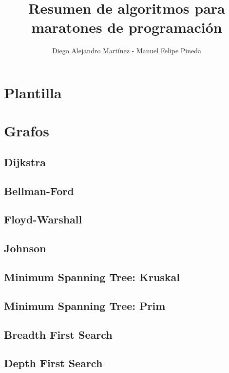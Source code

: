\documentclass[10pt,letterpaper,twocolumn,twosided]{article}
\newcommand{\codigofuente}[1]{

\dotfill
}
\begin{document}
\title{Resumen de algoritmos para maratones de programación}
\author{Diego Alejandro Martínez - Manuel Felipe Pineda}
\maketitle

\tableofcontents
{}


\section{Plantilla}
\codigofuente{../src/template.ext}

\section{Grafos}

\subsection{Dijkstra}

\subsection{Bellman-Ford}

\subsection{Floyd-Warshall}

\subsection{Johnson}

\subsection{Minimum Spanning Tree: Kruskal}

\subsection{Minimum Spanning Tree: Prim}

\subsection{Breadth First Search}

\subsection{Depth First Search}
\end{document}

